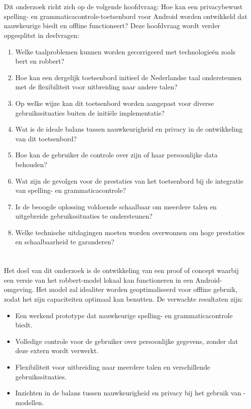\section{}%
\label{sec:onderzoeksvraag}

Dit onderzoek richt zich op de volgende hoofdvraag: Hoe kan een privacybewust spelling- en grammaticacontrole-toetsenbord voor Android worden ontwikkeld dat nauwkeurige  biedt en offline functioneert? Deze hoofdvraag wordt verder opgesplitst in deelvragen:
\begin{enumerate}
    \item Welke taalproblemen kunnen worden gecorrigeerd met technologieën zoals \gls{bert} en \gls{robbert}?
    \item Hoe kan een dergelijk toetsenbord initieel de Nederlandse taal ondersteunen met de flexibiliteit voor uitbreiding naar andere talen?
    \item Op welke wijze kan dit toetsenbord worden aangepast voor diverse gebruikssituaties buiten de initiële implementatie?
    \item Wat is de ideale balans tussen nauwkeurigheid en privacy in de ontwikkeling van dit toetsenbord?
    \item Hoe kan de gebruiker de controle over zijn of haar persoonlijke data behouden?
    \item Wat zijn de gevolgen voor de prestaties van het toetsenbord bij de integratie van spelling- en grammaticacontrole?
    \item Is de beoogde oplossing voldoende schaalbaar om meerdere talen en uitgebreide gebruikssituaties te ondersteunen?
    \item Welke technische uitdagingen moeten worden overwonnen om hoge prestaties en schaalbaarheid te garanderen?
\end{enumerate}

\section{}%
\label{sec:onderzoeksdoelstelling}

Het doel van dit onderzoek is de ontwikkeling van een proof of concept waarbij een versie van het \gls{robbert}-model lokaal kan functioneren in een Android-omgeving. Het model zal idealiter worden geoptimaliseerd voor offline gebruik, zodat het zijn capaciteiten optimaal kan benutten. De verwachte resultaten zijn:
\begin{itemize}
    \item Een werkend prototype dat nauwkeurige spelling- en grammaticacontrole biedt.
    \item Volledige controle voor de gebruiker over persoonlijke gegevens, zonder dat deze extern wordt verwerkt.
    \item Flexibiliteit voor uitbreiding naar meerdere talen en verschillende gebruikssituaties.
    \item Inzichten in de balans tussen nauwkeurigheid en privacy bij het gebruik van -modellen.
\end{itemize}

